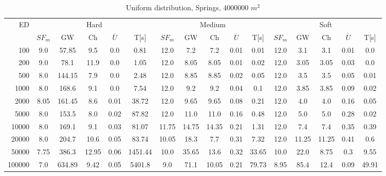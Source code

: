 \begin{table}[htb]
	\centering
	\begin{tabular}{|r|c|c|c|c|c|c|c|c|c|c|c|c|c|c|c|} 
		\hline
		\multirow{2}{*}{ED} & \multicolumn{5}{c|}{Hard} & \multicolumn{5}{c|}{Medium} &\multicolumn{5}{c|}{Soft} \\ 
		\cline{2-16} 
		&$SF_{m}$&GW & Ch & $\overline{U}$&T[s] &$SF_{m}$&GW & Ch & $\overline{U}$ &T[s] &$SF_{m}$&GW & Ch & $\overline{U}$  & T[s]  \\ 
		\hline 
		100 & 9.0 & 57.85 & 9.5 & 0.0 & 0.81 & 12.0 & 7.2 & 7.2 & 0.01 & 0.01 & 12.0 & 3.1 & 3.1 & 0.01 & 0.0\\ 
		200 & 9.0 & 78.1 & 11.9 & 0.0 & 1.05 & 12.0 & 8.05 & 8.05 & 0.01 & 0.02 & 12.0 & 3.05 & 3.05 & 0.03 & 0.0\\ 
		500 & 8.0 & 144.15 & 7.9 & 0.0 & 2.48 & 12.0 & 8.85 & 8.85 & 0.02 & 0.05 & 12.0 & 3.5 & 3.5 & 0.05 & 0.01\\ 
		1000 & 8.0 & 168.6 & 9.1 & 0.0 & 7.54 & 12.0 & 9.2 & 9.2 & 0.04 & 0.1 & 12.0 & 3.85 & 3.85 & 0.09 & 0.02\\ 
		2000 & 8.05 & 161.45 & 8.6 & 0.01 & 38.72 & 12.0 & 9.65 & 9.65 & 0.08 & 0.21 & 12.0 & 4.0 & 4.0 & 0.16 & 0.05\\ 
		5000 & 8.0 & 153.5 & 8.0 & 0.02 & 87.82 & 12.0 & 11.0 & 11.0 & 0.16 & 0.48 & 12.0 & 5.0 & 5.0 & 0.28 & 0.02\\ 
		10000 & 8.0 & 169.1 & 9.1 & 0.03 & 81.07 & 11.75 & 14.75 & 14.35 & 0.21 & 1.31 & 12.0 & 7.4 & 7.4 & 0.35 & 0.39\\ 
		20000 & 8.0 & 204.7 & 10.6 & 0.05 & 83.74 & 10.05 & 18.3 & 7.7 & 0.31 & 7.32 & 12.0 & 11.25 & 11.25 & 0.41 & 0.6\\ 
		50000 & 7.75 & 386.3 & 12.95 & 0.06 & 1451.44 & 10.0 & 35.65 & 13.6 & 0.32 & 33.65 & 10.0 & 22.0 & 8.75 & 0.3 & 9.55\\ 
		100000 & 7.0 & 634.89 & 9.42 & 0.05 & 5401.8 & 9.0 & 71.1 & 10.05 & 0.21 & 79.73 & 8.95 & 85.4 & 12.4 & 0.09 & 49.91\\ 
		\hline 
	\end{tabular} 
	\caption{Uniform distribution, Springs, 4000000 $m^2$} 
	\label{tab:UnSprings2000} 
\end{table} 
